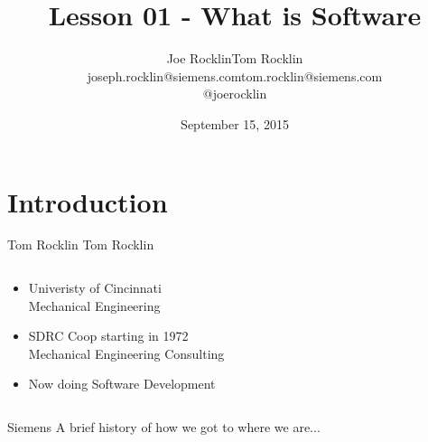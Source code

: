 \documentclass[serif,mathserif,compress]{beamer}
\begin{document}
\author[Joe Rocklin]{
\begin{tabular}[t]{c c}
  Joe Rocklin & Tom Rocklin \\
  joseph.rocklin@siemens.com &  tom.rocklin@siemens.com \\
  @joerocklin &
\end{tabular}
}

\title[Lesson 01\hspace{2em}\insertframenumber/\inserttotalframenumber]{Lesson 01 - What is Software}

\date{September 15, 2015} %


\maketitle

\section{Introduction}  %
\begin{frame}{Tom Rocklin}
  Tom Rocklin
  \begin{columns}[T]
  \begin{column}[T]{.5\textwidth}
    \begin{itemize}
    \item Univeristy of Cincinnati\\Mechanical Engineering
    \item SDRC Coop starting in 1972\\Mechanical Engineering Consulting
    \item Now doing Software Development
    \end{itemize}
  \end{column}
  \end{columns}
\end{frame}

\begin{frame}{Siemens}
  A brief history of how we got to where we are...
\end{frame}
\end{document}
